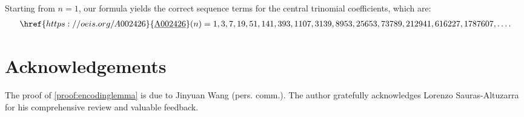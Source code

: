 \documentclass[10pt]{article}
\theoremstyle{plain}
\newcommand{\seqnum}[1]{\href{https://oeis.org/#1}{\rm \underline{#1}}}
\begin{document}
Starting from $n=1$, our formula yields the correct sequence terms for the central trinomial coefficients, which are:
\begin{align*}
\seqnum{A002426}(n) = 1,3,7,19,51,141,393,1107,3139,8953,25653,73789,212941,616227,1787607,\ldots .
\end{align*}

\section{Acknowledgements}
The proof of \cref{proof:encodinglemma} is due to Jinyuan Wang (pers. comm.). The author gratefully acknowledges Lorenzo Sauras-Altuzarra for his comprehensive review and valuable feedback.

\footnotesize
\begingroup
\raggedright


\endgroup
\end{document}
